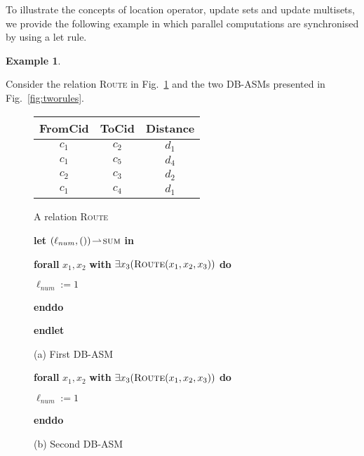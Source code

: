 \documentclass[preprint,11pt]{elsarticle}
\theoremstyle{definition}
\newtheorem{example}{Example}[section]
\theoremstyle{remark}
\begin{document}
To illustrate the concepts of location operator, update sets and update multisets, we provide the following example in which parallel computations are synchronised by using a let rule.

\begin{example}\label{exa:DBASM-let}

Consider the relation \textsc{Route} in Fig.~\ref{fig:DBASM-Route} and the two DB-ASMs presented in Fig.~\ref{fig:tworules}.


\begin{figure}[!htbp]
{\centering
\begin{tabular}{|c|c|c|}
  \hline
  FromCid & ToCid & Distance \\\hline\hline
  $c_1$ & $c_2$ & $d_1$ \\
  $c_1$ & $c_5$ & $d_4$ \\
  $c_2$ & $c_3$ & $d_2$ \\
  $c_1$ & $c_4$ & $d_1$ \\
  \hline
\end{tabular}\caption{A relation
\textsc{Route}}\label{fig:DBASM-Route}}
\end{figure}


\begin{figure}[!htbp]
 \hspace{3cm}\textbf{let} $(\ell_{num},())
\!\rightharpoonup\! \textsc{sum}$ \textbf{in}

\hspace{3.5cm}\textbf{forall} $x_1,x_2$ \textbf{with}
$\exists x_3 (\textsc{Route}(x_1,x_2,x_3))$ \textbf{do}

\hspace{4cm} $\ell_{num}:= 1$

\hspace{3.5cm}\textbf{enddo}

\hspace{3cm}\textbf{endlet}

\smallskip
\hspace{4cm}(a) First DB-ASM

\bigskip
\hspace{3cm}\textbf{forall} $x_1,x_2$ \textbf{with}
$\exists x_3 (\textsc{Route}(x_1,x_2,x_3))$ \textbf{do}

\hspace{3.5cm} $\ell_{num}:= 1$

\hspace{3cm}\textbf{enddo}

\smallskip
\hspace{4cm}(b) Second DB-ASM


\end{figure}
\end{example}
\end{document}
